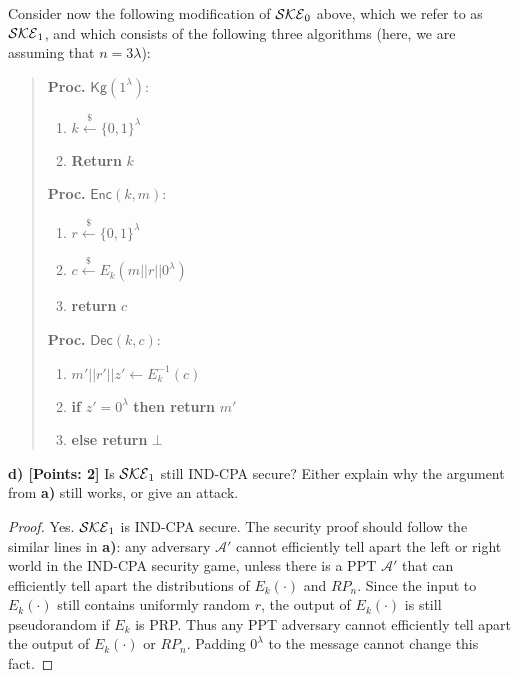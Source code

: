\documentclass[12pt]{article}
\newcommand{\bits}{\{0,1\}}
\newcommand{\getsr}{\stackrel{\$}{\gets}}
\theoremstyle{definition}
\newcommand{\Kg}{\textsf{Kg}}
\newcommand{\Enc}{\textsf{Enc}}
\newcommand{\Dec}{\textsf{Dec}}
\newcommand{\A}{\mathcal{A}}
\begin{document}
Consider now the following modification of $\mathcal{SKE}_0$ above, which we refer to as $\mathcal{SKE}_1$, and which consists of the following three algorithms (here, we are assuming that $n=3\lambda$):
\begin{quote}
\begin{minipage}[t]{0.25\textwidth}
{\bf Proc.} $\Kg(1^\lambda)$:
\begin{enumerate}
\item $k \getsr \bits^\lambda$
\item {\bf Return} $k$
\end{enumerate}
\end{minipage}
\begin{minipage}[t]{0.3\textwidth}
{\bf Proc.} $\Enc(k, m)$:
\begin{enumerate}
\item $r \getsr \bits^\lambda$
\item $c \getsr E_k (m||r||0^\lambda)$
\item {\bf return} $c$
\end{enumerate}
\end{minipage}
\begin{minipage}[t]{0.3\textwidth}
{\bf Proc.} $\Dec(k, c)$:
\begin{enumerate}
\item $m'||r'||z' \gets E_k^{-1} (c)$
\item {\bf if} $z'=0^\lambda$ {\bf then return} $m'$
\item {\bf else return} $\bot$
\end{enumerate}
\end{minipage}
\end{quote}

{\bf d) [Points: 2]} Is $\mathcal{SKE}_1$ still IND-CPA secure? Either explain why the argument from {\bf a)} still works, or give an attack.
\begin{proof}
Yes. $\mathcal{SKE}_1$ is IND-CPA secure. The security proof should follow the similar lines in {\bf a)}: any adversary $\A'$ cannot efficiently tell apart the left or right world in the IND-CPA security game, unless there is a PPT $\A'$ that can efficiently tell apart the distributions of $E_k(\cdot)$ and $RP_n$. Since the input to $E_k(\cdot)$ still contains uniformly random $r$, the output of $E_k(\cdot)$ is still pseudorandom if $E_k$ is PRP. Thus any PPT adversary cannot efficiently tell apart the output of $E_k(\cdot)$ or $RP_n$. Padding $0^\lambda$ to the message cannot change this fact.
\end{proof}
\end{document}
